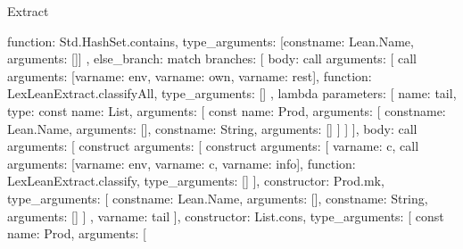 \begin{lexlean}{Extract}
\begin{toolingmodule}
{{{{{{                function: Std.HashSet.contains,
                type_arguments: [const{name: Lean.Name, arguments: []}]
              },
              else_branch: match{
                branches: [
                  {
                    body: call{
                      arguments: [
                        call{
                          arguments: [var{name: env}, var{name: own}, var{name: rest}],
                          function: LexLeanExtract.classifyAll,
                          type_arguments: []
                        },
                        lambda{
                          parameters: [
                            {
                              name: tail,
                              type: const{
                                name: List,
                                arguments: [
                                  const{
                                    name: Prod,
                                    arguments: [
                                      const{name: Lean.Name, arguments: []},
                                      const{name: String, arguments: []}
                                    ]
                                  }
                                ]
                              }
                            }
                          ],
                          body: call{
                            arguments: [
                              construct{
                                arguments: [
                                  construct{
                                    arguments: [
                                      var{name: c},
                                      call{
                                        arguments: [var{name: env}, var{name: c}, var{name: info}],
                                        function: LexLeanExtract.classify,
                                        type_arguments: []
                                      }
                                    ],
                                    constructor: Prod.mk,
                                    type_arguments: [
                                      const{name: Lean.Name, arguments: []},
                                      const{name: String, arguments: []}
                                    ]
                                  },
                                  var{name: tail}
                                ],
                                constructor: List.cons,
                                type_arguments: [
                                  const{
                                    name: Prod,
                                    arguments: [
}}}}}}}}}}}}
\end{toolingmodule}
\end{lexlean}
